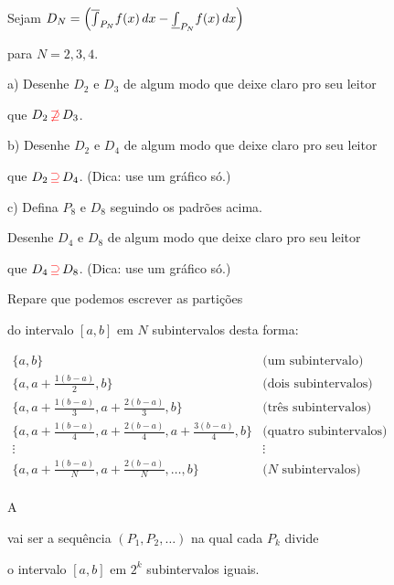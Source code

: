 \documentclass[oneside,12pt]{article}
\begin{document}
Sejam $D_N = \left( \overline \int_{P_N} f(x) \, dx - \underline\int_{P_N} f(x) \, dx \right)$

para $N=2,3,4$.

\msk

a) Desenhe $D_2$ e $D_3$ de algum modo que deixe claro pro seu leitor

que $D_2 \, \ColorRed{\not\supseteq} \, D_3$.

\ssk

b) Desenhe $D_2$ e $D_4$ de algum modo que deixe claro pro seu leitor

que $D_2 \, \ColorRed{\supseteq} \, D_4$. (Dica: use um gráfico só.)

\msk

c) Defina $P_8$ e $D_8$ seguindo os padrões acima.

Desenhe $D_4$ e $D_8$ de algum modo que deixe claro pro seu leitor

que $D_4 \, \ColorRed{\supseteq} \, D_8$. (Dica: use um gráfico só.)



\newpage


Repare que podemos escrever as partições

do intervalo $[a,b]$ em $N$ subintervalos desta forma:

\ssk

\def\atowb#1#2{a+\frac{#1(b-a)}{#2}}

$\begin{array}{ll}
 \{a,b\} & \text{(um subintervalo)} \\
 \{a,\atowb12,b\} & \text{(dois subintervalos)} \\
 \{a,\atowb13,\atowb23,b\} & \text{(três subintervalos)} \\
 \{a,\atowb14,\atowb24,\atowb34,b\} & \text{(quatro subintervalos)} \\
 \vdots & \vdots \\
 \{a,\atowb1N,\atowb2N,\ldots,b\} & \text{($N$ subintervalos)} \\
 \end{array}
$

\ssk

A 

vai ser a sequência $(P_1, P_2, \ldots)$ na qual cada $P_k$ divide

o intervalo $[a,b]$ em $2^k$ subintervalos iguais.
\end{document}
